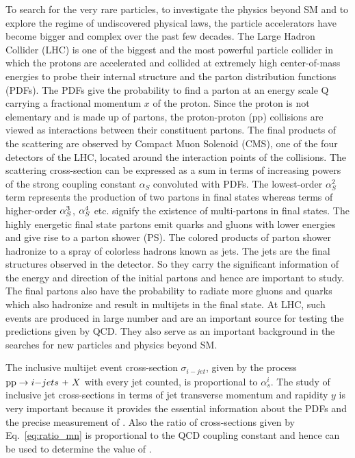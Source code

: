 To search for the very rare particles, to investigate the physics beyond SM and to explore the regime of undiscovered physical laws, the particle accelerators have become bigger and complex over the past few decades. The Large Hadron Collider (LHC) is one of the biggest and the most powerful particle collider in which the protons are accelerated and collided at extremely high center-of-mass energies to probe their internal structure and the parton distribution functions (PDFs). The PDFs give the probability to find a parton at an energy scale Q carrying a fractional momentum $x$ of the proton. Since the proton is not elementary and is made up of partons, the proton-proton (pp) collisions are viewed as interactions between their constituent partons. The final products of the scattering are observed by Compact Muon Solenoid (CMS), one of the four detectors of the LHC, located around the interaction points of the collisions. The scattering cross-section can be expressed as a sum in terms of increasing powers of the strong coupling constant $\alpha_{S}$ convoluted with PDFs. The lowest-order $\alpha_{S}^{2}$ term represents the production of two partons in final states whereas terms of higher-order $\alpha_S^3$, $\alpha_S^4$ etc. signify the existence of multi-partons in final states. The highly energetic final state partons emit quarks and gluons with lower energies and give rise to a parton shower (PS). The colored products of parton shower hadronize to a spray of colorless hadrons known as jets. The jets are the final structures observed in the detector. So they carry the significant information of the energy and direction of the initial partons and hence are important to study. The final partons also have the probability to radiate more gluons and quarks which also hadronize and result in multijets in the final state. At LHC, such events are produced in large number and are an important source for testing the predictions given by QCD. They also serve as an important background in the searches for new particles and physics beyond SM. 

The inclusive multijet event cross-section $\sigma_{i-jet}$, given by the process ${{\rm pp}\to i{\rm-}jets~\plus X}$ with every jet counted, is proportional to $\alpha^{i}_{s}$. The study of inclusive jet cross-sections in terms of jet transverse momentum \pt and rapidity $y$ is very important because it provides the essential information about the PDFs and the precise measurement of \alps. Also the ratio of cross-sections given by Eq.~\ref{eq:ratio_mn} is proportional to the QCD coupling constant \alps and hence can be used to determine the value of \alps. 

